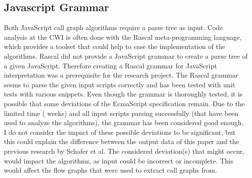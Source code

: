 \documentclass[journal,10pt]{IEEEtran}
\begin{document}
\subsection{Javascript Grammar}
Both JavaScript call graph algorithms require a parse tree as input. Code analysis at the CWI is often done with the Rascal meta-programming language, which provides a toolset that could help to ease the implementation of the algorithms. Rascal did not provide a JavaScript grammar to create a parse tree of a given JavaScript. Therefore creating a Rascal grammar for JavaScript interpretation was a prerequisite for the research project. The Rascal grammar seems to parse the given input scripts correctly and has been tested with unit tests with various snippets. Even though the grammar is thoroughly tested, it is possible that some deviations of the EcmaScript specification remain.
Due to the limited time ( weeks) and all input scripts parsing successfully (that have been used to analyze the algorithms), the grammar has been considered good enough. I do not consider the impact of these possible deviations to be significant, but this could explain the difference between the output data of this paper and the previous research by Schafer et al. %
The considered deviation(s) that might occur, would impact the algorithms, as input could be incorrect or incomplete. This would affect the flow graphs that were used to extract call graphs from.
\end{document}
